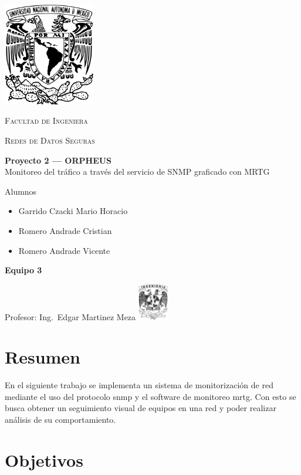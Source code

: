 \documentclass[letterpaper]{article}
\begin{document}
\begin{titlepage}
  \centering
  \includegraphics[width=0.3\textwidth]{unam_logo}\vfill{}
  {\scshape\Huge Facultad de Ingeniera\par}\vspace{0.5cm}
  {\scshape\Large Redes de Datos Seguras\par}\vfill
  {\huge \textbf{Proyecto 2 --- ORPHEUS}\\Monitoreo del tráfico a través del
servicio de SNMP graficado con MRTG}\vfill
  
  {\Large
    Alumnos\begin{itemize}
    \item Garrido Czacki Mario Horacio
    \item Romero Andrade Cristian
    \item Romero Andrade Vicente

    \end{itemize}
    \textbf{Equipo 3}
  }\vfill
  {\large Profesor: Ing.~Edgar Martinez Meza}\vfill
  \includegraphics[width=0.1\textwidth]{inge_logo}
  
  
\end{titlepage}

\tableofcontents{}\newpage

\section{Resumen}\label{sec:resumen}

En el siguiente trabajo se implementa un sistema de
monitorización de red mediante el uso del protocolo \acrshort{snmp} y 
el software de monitoreo \acrshort{mrtg}. 
Con esto se busca obtener un seguimiento visual de equipos en una red y poder realizar
análisis de su comportamiento.

\section{Objetivos}\label{sec:obj}
\end{document}
